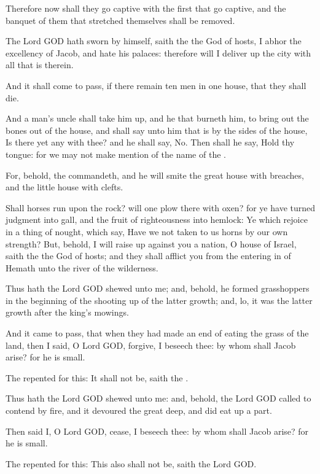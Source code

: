 \Verse Therefore now shall they go captive with the first that go captive, and the banquet of them that stretched themselves shall be removed.

\Verse The Lord GOD hath sworn by himself, saith the \LORD the God of hosts, I abhor the excellency of Jacob, and hate his palaces: therefore will I deliver up the city with all that is therein.

\Verse And it shall come to pass, if there remain ten men in one house, that they shall die.

\Verse And a man's uncle shall take him up, and he that burneth him, to bring out the bones out of the house, and shall say unto him that is by the sides of the house, Is there yet any with thee? and he shall say, No. Then shall he say, Hold thy tongue: for we may not make mention of the name of the \LORD.

\Verse For, behold, the \LORD commandeth, and he will smite the great house with breaches, and the little house with clefts.

\Verse Shall horses run upon the rock? will one plow there with oxen?  for ye have turned judgment into gall, and the fruit of righteousness into hemlock: \Verse Ye which rejoice in a thing of nought, which say, Have we not taken to us horns by our own strength?  \Verse But, behold, I will raise up against you a nation, O house of Israel, saith the \LORD the God of hosts; and they shall afflict you from the entering in of Hemath unto the river of the wilderness.


\Chapter
\Verse Thus hath the Lord GOD shewed unto me; and, behold, he formed grasshoppers in the beginning of the shooting up of the latter growth; and, lo, it was the latter growth after the king's mowings.

\Verse And it came to pass, that when they had made an end of eating the grass of the land, then I said, O Lord GOD, forgive, I beseech thee: by whom shall Jacob arise? for he is small.

\Verse The \LORD repented for this: It shall not be, saith the \LORD.

\Verse Thus hath the Lord GOD shewed unto me: and, behold, the Lord GOD called to contend by fire, and it devoured the great deep, and did eat up a part.

\Verse Then said I, O Lord GOD, cease, I beseech thee: by whom shall Jacob arise? for he is small.

\Verse The \LORD repented for this: This also shall not be, saith the Lord GOD.

